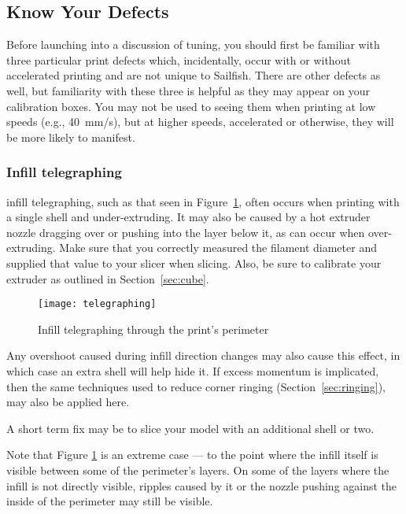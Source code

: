\subsection{Know Your Defects}

Before launching into a discussion of tuning, you should first be
familiar with three particular print defects which, incidentally,
occur with or without accelerated printing and are not unique to Sailfish.  There are other defects as
well, but familiarity with these three is helpful as they may appear on
your calibration boxes.  You may not be used to seeing them when
printing at low speeds (e.g., 40~mm/s), but at higher speeds,
accelerated or otherwise, they will be more likely to manifest.

\subsubsection{Infill telegraphing} \label{sec:telegraphing}

\Gls{infill} \gls{telegraphing}, such as that seen in
Figure~\ref{fig:telegraphing},
often occurs when printing with a single \gls{shell} and under-extruding.
It may also be caused by a hot extruder nozzle dragging over or pushing
into the layer below it, as can occur when over-extruding.  Make sure
that you correctly measured the filament diameter and supplied that value to your
slicer when slicing.  Also, be sure to calibrate your extruder as outlined in
Section~\ref{sec:cube}.

\begin{figure}[!htbp]
  \centering
    \texttt{[image: telegraphing]}
    \caption{Infill telegraphing through the print's perimeter}
  \label{fig:telegraphing}
\end{figure}

Any overshoot caused during infill direction changes may also cause this effect, in which case an extra
shell will help hide it. If excess momentum is implicated, then the
same techniques used to reduce corner ringing
(Section~\ref{sec:ringing}), may also be applied here.

A short term fix may be to slice your model with an additional shell or two.

Note that Figure \ref{fig:telegraphing} is an extreme case --- to the point where the
infill itself is visible between some of the perimeter's layers. On
some of the layers where the infill is not directly visible, ripples caused by
it or the nozzle pushing against the inside of the perimeter may still be
visible.


